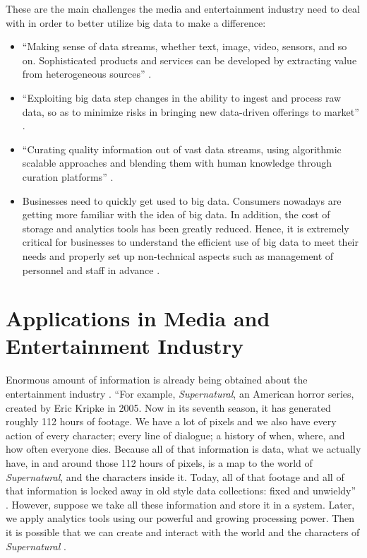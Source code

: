 These are the main challenges the media and entertainment industry need to deal with in order to better utilize big data to make a difference:
\begin{itemize}

  \item ``Making sense of data streams, whether text, image, video, sensors, and so on. Sophisticated products and services can be developed by extracting value from heterogeneous sources'' \cite{Lippell2016sectors}.
 
  \item ``Exploiting big data step changes in the ability to ingest and process raw data, so as to minimize risks in bringing new data-driven offerings to market'' \cite{Lippell2016sectors}.
 
  \item ``Curating quality information out of vast data streams, using algorithmic scalable approaches and blending them with human knowledge through curation platforms'' \cite{Lippell2016sectors}.
 
  \item Businesses need to quickly get used to big data. Consumers nowadays are getting more familiar with the idea of big data. In addition, the cost of storage and analytics tools has been greatly reduced. Hence, it is extremely critical for businesses to understand the efficient use of big data to meet their needs and properly set up non-technical aspects such as management of personnel and staff in advance \cite{Lippell2016sectors}.
 
\end{itemize}

\section{Applications in Media and Entertainment Industry}

Enormous amount of information is already being obtained about the entertainment industry \cite{Schlieski2012data}. ``For example, {\em Supernatural}, an American horror series, created by Eric Kripke in 2005. Now in its seventh season, it has generated roughly 112 hours of footage. We have a lot of pixels and we also have every action of every character; every line of dialogue; a history of when, where, and how often everyone dies. Because all of that information is data, what we actually have, in and around those 112 hours of pixels, is a map to the world of {\em Supernatural}, and the characters inside it. Today, all of that footage and all of that information is locked away in old style data collections: fixed and unwieldy'' \cite{Schlieski2012data}. However, suppose we take all these information and store it in a system. Later, we apply analytics tools using our powerful and growing processing power. Then it is possible that we can create and interact with the world and the characters of {\em Supernatural} \cite{Schlieski2012data}.

